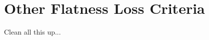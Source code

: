 \documentclass{JINST}
\theoremstyle{definition}
\theoremstyle{remark}
\begin{document}
\appendix
\section{Other Flatness Loss Criteria}

Clean all this up...



\end{document}
